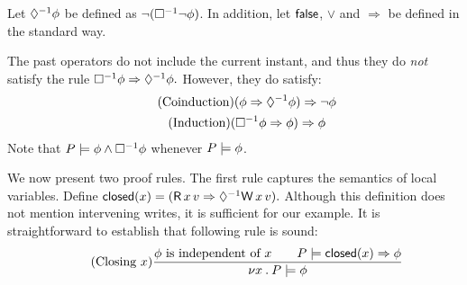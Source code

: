 Let $\Diamond^{-1}\phi$ be defined as $\lnot(\Box^{-1}\lnot\phi)$. 
In addition, let $\mathsf{false}$, $\lor$ and $\Rightarrow$ be defined in the
standard way.

The past operators do not include the current instant, and thus 
they do \emph{not} satisfy the rule
\begin{math}
  \Box^{-1}\phi\Rightarrow\Diamond^{-1}\phi.
\end{math}
However, they do satisfy:
\begin{gather*}
  \tag{Coinduction}
  (\phi \Rightarrow\Diamond^{-1}{\phi}) \Rightarrow\lnot \phi
  \\
  \tag{Induction}
  (\Box^{-1}\phi \Rightarrow\phi) \Rightarrow\phi
\end{gather*}
Note that $P \models \phi \land \Box^{-1}\phi$ whenever $P \models \phi$.

We now present two proof rules.  The first rule captures the semantics of
local variables.  Define
\begin{math}
  \closed(\aLoc) = (\DR{\aLoc}{\aVal} \Rightarrow \once \DW{\aLoc}{\aVal}).
\end{math}
Although this definition does not mention intervening writes, it is
sufficient for our example.  It is straightforward to establish that
following rule is sound:
\begin{displaymath}
  \tag{Closing $\aLoc$}
  \frac{
    \afo \text{ is independent of } \aLoc
    \qquad
    \aPS \models \closed(\aLoc) \Rightarrow \afo
  }{
    \nu \aLoc \st \aPS \models \afo
  }
\end{displaymath}

